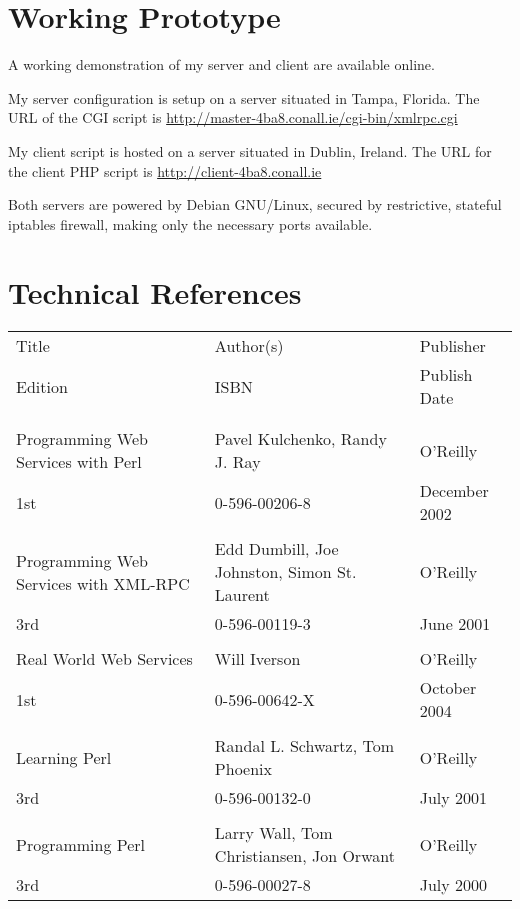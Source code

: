 \documentclass[a4paper,10pt]{article}
\begin{document}
\section{Working Prototype}

A working demonstration of my server and client are available online.


My server configuration is setup on a server situated in Tampa, Florida.
The URL of the CGI script is
\url{http://master-4ba8.conall.ie/cgi-bin/xmlrpc.cgi}


My client script is hosted on a server situated in Dublin, Ireland. The
URL for the client PHP script is
\url{http://client-4ba8.conall.ie}


Both servers are powered by Debian GNU/Linux, secured by restrictive, 
stateful iptables firewall, making only the necessary ports available.

\section{Technical References}

\begin{tabular}{lll}
Title	&	Author(s)	&	Publisher	\\
Edition	&	ISBN	&	Publish Date 	\\
			&			&						\\
			&			&						\\
Programming Web Services with Perl	&	Pavel Kulchenko,  Randy J. Ray	&
O'Reilly	\\
1st&	0-596-00206-8 & December 2002	\\
			&			&						\\
Programming Web Services with XML-RPC & Edd Dumbill, Joe Johnston, Simon
St. Laurent &	O'Reilly	\\
3rd & 0-596-00119-3	&	June 2001	\\
			&			&						\\
Real World Web Services	&	Will Iverson	&	O'Reilly	\\
1st & 0-596-00642-X	&	October 2004	\\
			&			&						\\
Learning Perl	&	Randal L. Schwartz, Tom Phoenix	&	O'Reilly	\\
3rd  		&	0-596-00132-0	&	July 2001	\\
			&			&						\\
Programming Perl	&	Larry Wall, Tom Christiansen, Jon Orwant	&
O'Reilly	\\
3rd		&	0-596-00027-8	&	July 2000	\\
\end{tabular}
\end{document}

